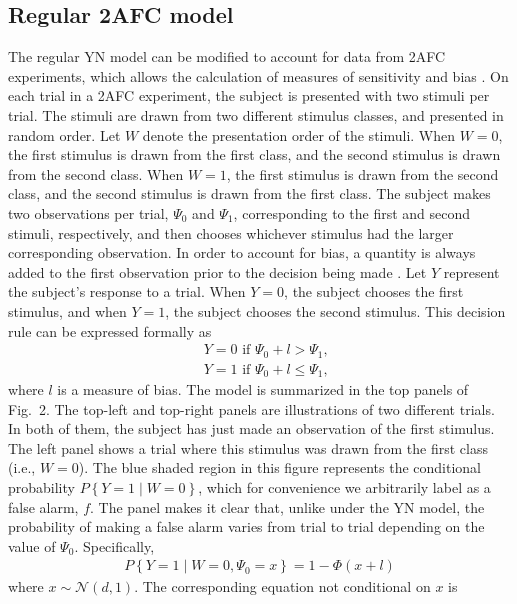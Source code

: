 \documentclass[man]{apa6}
\begin{document}
\subsection{Regular 2AFC model}
The regular YN model can be modified to account for data from 2AFC experiments, which allows the calculation of measures of sensitivity and bias \parencite[][]{decarloon2012}. On each trial in a 2AFC experiment, the subject is presented with two stimuli per trial. The stimuli are drawn from two different stimulus classes, and presented in random order. Let $W$ denote the presentation order of the stimuli. When $W=0$, the first stimulus is drawn from the first class, and the second stimulus is drawn from the second class. When $W=1$, the first stimulus is drawn from the second class, and the second stimulus is drawn from the first class. The subject makes two observations per trial, $\Psi_0$ and $\Psi_1$, corresponding to the first and second stimuli, respectively, and then chooses whichever stimulus had the larger corresponding observation. In order to account for bias, a quantity is always added to the first observation prior to the decision being made \parencite[see][]{decarloon2012}. Let $Y$ represent the subject's response to a trial. When $Y=0$, the subject chooses the first stimulus, and when $Y=1$, the subject chooses the second stimulus. This decision rule can be expressed formally as
\begin{eqnarray*}
&Y=0\textrm{ if }\Psi_0+l>\Psi_1\textrm{,}\\
&Y=1\textrm{ if }\Psi_0+l\le\Psi_1\textrm{,}
\end{eqnarray*}where $l$ is a measure of bias. The model is summarized in the top panels of Fig.~2. The top-left and top-right panels are illustrations of two different trials. In both of them, the subject has just made an observation of the first stimulus. The left panel shows a trial where this stimulus was drawn from the first class (i.e., $W=0$). The blue shaded region in this figure represents the conditional probability $P\left\{Y=1\mid{}W=0\right\}$, which for convenience we arbitrarily label as a false alarm, $f$. The panel makes it clear that, unlike under the YN model, the probability of making a false alarm varies from trial to trial depending on the value of $\Psi_0$. Specifically,
\begin{eqnarray*}
P\left\{Y=1\mid{}W=0,\Psi_0=x\right\}=1-\Phi\left(x+l\right)
\end{eqnarray*} where $x\sim\mathcal{N}\left(d,1\right)$. The corresponding equation not conditional on $x$ is
\end{document}
